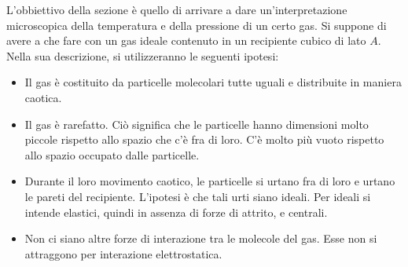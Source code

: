 \documentclass[10pt,a4paper]{book}
\begin{document}
L'obbiettivo della sezione è quello di arrivare a dare un'interpretazione microscopica della temperatura e della pressione di un certo gas.
Si suppone di avere a che fare con un gas ideale contenuto in un recipiente cubico di lato $A$. Nella sua descrizione, si utilizzeranno le seguenti ipotesi:
\begin{itemize}
	\item Il gas è costituito da particelle molecolari tutte uguali e distribuite in maniera caotica.
	\item Il gas è rarefatto. Ciò significa che le particelle hanno dimensioni molto piccole rispetto allo spazio che c'è fra di loro. C'è molto più vuoto rispetto allo spazio occupato dalle particelle.
	\item Durante il loro movimento caotico, le particelle si urtano fra di loro e urtano le pareti del recipiente. L'ipotesi è che tali urti siano ideali. Per ideali si intende elastici, quindi in assenza di forze di attrito, e centrali.
	\item Non ci siano altre forze di interazione tra le molecole del gas. Esse non si attraggono per interazione elettrostatica.
\end{itemize}
\end{document}
